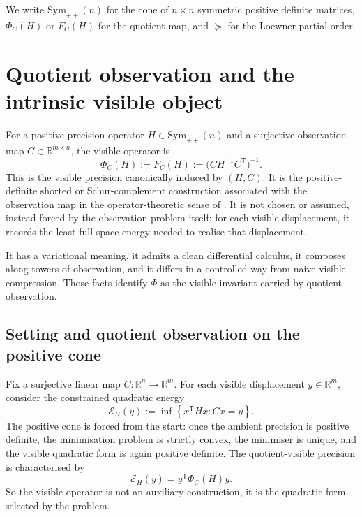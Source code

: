 \documentclass[11pt]{article}
\numberwithin{equation}{section}
\newcommand{\Sym}{\mathrm{Sym}}
\theoremstyle{thmcompact}
\theoremstyle{remark}
\begin{document}
We write $\Sym_{++}(n)$ for the cone of $n \times n$ symmetric positive definite matrices, $\Phi_C(H)$ or $F_C(H)$ for the quotient map, and $\succeq$ for the Loewner partial order.


\section{Quotient observation and the intrinsic visible object}
\label{sec:quotient-precision}

For a positive precision operator $H \in \Sym_{++}(n)$ and a surjective observation map $C \in \mathbb{R}^{m \times n}$, the visible operator is
\begin{equation}
\Phi_C(H)
:=
F_C(H)
:=
\bigl(C H^{-1} C^{\mathsf T}\bigr)^{-1}.
\label{eq:quotient-observation-map}
\end{equation}
This is the visible precision canonically induced by $(H,C)$. It is the positive-definite shorted or Schur-complement construction associated with the observation map in the operator-theoretic sense of \cite{Schur1917,Anderson1971,AndersonDuffin1969,AndersonTrapp1975,Bhatia2007}. It is not chosen or assumed, instead forced by the observation problem itself: for each visible displacement, it records the least full-space energy needed to realise that displacement.

It has a variational meaning, it admits a clean differential calculus, it composes along towers of observation, and it differs in a controlled way from naive visible compression. Those facts identify $\Phi$ as the visible invariant carried by quotient observation.

\subsection{Setting and quotient observation on the positive cone}

Fix a surjective linear map $C : \mathbb{R}^n \to \mathbb{R}^m$. For each visible displacement $y \in \mathbb{R}^m$, consider the constrained quadratic energy
\begin{equation}
\mathcal E_H(y)
:=
\inf\!\left\{ x^{\mathsf T} H x : Cx = y \right\}.
\label{eq:full-space-energy}
\end{equation}
The positive cone is forced from the start: once the ambient precision is positive definite, the minimisation problem is strictly convex, the minimiser is unique, and the visible quadratic form is again positive definite. The quotient-visible precision is characterised by
\begin{equation}
\mathcal E_H(y)=y^{\mathsf T} \Phi_C(H) y.
\label{eq:variational-characterisation}
\end{equation}
So the visible operator is not an auxiliary construction, it is the quadratic form selected by the problem.
\end{document}
